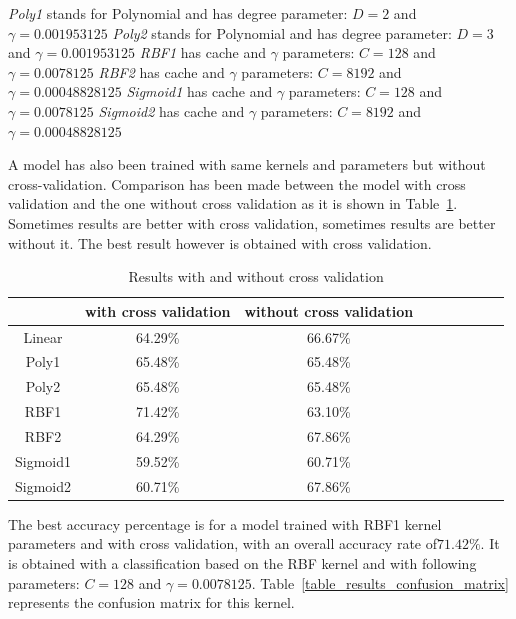 \noindent \textit{Poly1} stands for Polynomial and has degree parameter: $ D = 2 $ and $ \gamma = 0.001953125 $
\newline
\noindent \textit{Poly2} stands for Polynomial and has degree parameter: $ D = 3 $ and $ \gamma = 0.001953125 $
\newline
\noindent \textit{RBF1} has cache and $\gamma$ parameters: $ C = 128 $ and $ \gamma = 0.0078125 $
\newline
\noindent \textit{RBF2} has cache and $\gamma$ parameters: $ C = 8192 $ and $ \gamma = 0.00048828125 $ 
\newline
\noindent \textit{Sigmoid1} has cache and $\gamma$ parameters: $ C = 128 $ and $ \gamma = 0.0078125 $
\newline
\noindent \textit{Sigmoid2} has cache and $\gamma$ parameters: $ C = 8192 $ and $ \gamma = 0.00048828125 $
\newline

\noindent A model has also been trained with same kernels and parameters but without cross-validation. Comparison has been made between the model with cross validation and the one without cross validation as it is shown in  Table~\ref{table_results_crossvalidation}. Sometimes results are better with cross validation, sometimes results are better without it. The best result however is obtained with cross validation.
\newline

\begin{table}[h]
\begin{center}
   \caption{\label{table_results_crossvalidation} Results with and without cross validation}
\begin{tabular}{|c|c|c|c|c|c|c|c|c|}
  \hline
    & with cross validation & without cross validation \\
  \hline
  Linear & 64.29\% & 66.67\% \\
  Poly1 & 65.48\% & 65.48\% \\
  Poly2 & 65.48\% & 65.48\% \\
  RBF1 & 71.42\% & 63.10\% \\
  RBF2 & 64.29\% & 67.86\% \\
  Sigmoid1 & 59.52\% & 60.71\% \\
  Sigmoid2 & 60.71\% & 67.86\% \\
  \hline
\end{tabular}
\end{center}
\end{table}

\noindent The best accuracy percentage is for a model trained with RBF1 kernel parameters and with cross validation, with an overall accuracy rate of$ 71.42\% $. It is obtained with a classification based on the RBF kernel and with following parameters: $ C = 128 $ and $ \gamma = 0.0078125 $. Table~\ref{table_results_confusion_matrix} represents the confusion matrix for this kernel.
\newline

